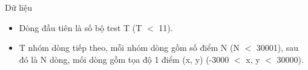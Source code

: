Dữ liệu
\begin{itemize}
	\item     Dòng đầu tiên là số bộ test T (T $<$ 11).   
	\item     T nhóm dòng tiếp theo, mỗi nhóm dòng gồm số điểm N (N $<$ 30001), sau đó là N dòng, mối dòng gồm tọa độ 1 điểm (x, y) (-3000 $<$ x, y $<$ 30000).   
\end{itemize}